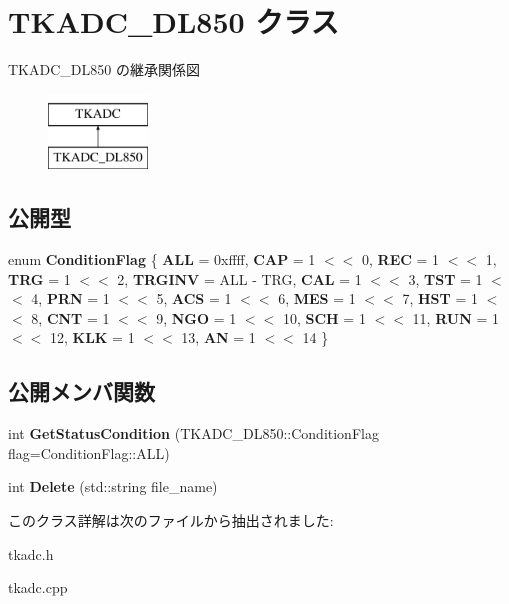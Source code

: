\hypertarget{class_t_k_a_d_c___d_l850}{}\section{T\+K\+A\+D\+C\+\_\+\+D\+L850 クラス}
\label{class_t_k_a_d_c___d_l850}
T\+K\+A\+D\+C\+\_\+\+D\+L850 の継承関係図\begin{figure}[H]
\begin{center}
\leavevmode
\includegraphics[height=2.000000cm]{class_t_k_a_d_c___d_l850}
\end{center}
\end{figure}
\subsection*{公開型}
\begin{DoxyCompactItemize}
\item 
\mbox{\label{class_t_k_a_d_c___d_l850_a25f41a7cd5213cd9814195b3d6ba11c0}} 
enum {\bfseries Condition\+Flag} \{ \newline
{\bfseries A\+LL} = 0xffff, 
{\bfseries C\+AP} = 1 $<$$<$ 0, 
{\bfseries R\+EC} = 1 $<$$<$ 1, 
{\bfseries T\+RG} = 1 $<$$<$ 2, 
\newline
{\bfseries T\+R\+G\+I\+NV} = A\+LL -\/ T\+RG, 
{\bfseries C\+AL} = 1 $<$$<$ 3, 
{\bfseries T\+ST} = 1 $<$$<$ 4, 
{\bfseries P\+RN} = 1 $<$$<$ 5, 
\newline
{\bfseries A\+CS} = 1 $<$$<$ 6, 
{\bfseries M\+ES} = 1 $<$$<$ 7, 
{\bfseries H\+ST} = 1 $<$$<$ 8, 
{\bfseries C\+NT} = 1 $<$$<$ 9, 
\newline
{\bfseries N\+GO} = 1 $<$$<$ 10, 
{\bfseries S\+CH} = 1 $<$$<$ 11, 
{\bfseries R\+UN} = 1 $<$$<$ 12, 
{\bfseries K\+LK} = 1 $<$$<$ 13, 
\newline
{\bfseries AN} = 1 $<$$<$ 14
 \}
\end{DoxyCompactItemize}
\subsection*{公開メンバ関数}
\begin{DoxyCompactItemize}
\item 
\mbox{\label{class_t_k_a_d_c___d_l850_a1eedebd8024beb6739c598e4970e6675}} 
int {\bfseries Get\+Status\+Condition} (T\+K\+A\+D\+C\+\_\+\+D\+L850\+::\+Condition\+Flag flag=Condition\+Flag\+::\+A\+LL)
\item 
\mbox{\label{class_t_k_a_d_c___d_l850_a209a0e5f4c6e61a7eb3ea21a15204a7c}} 
int {\bfseries Delete} (std\+::string file\+\_\+name)
\end{DoxyCompactItemize}


このクラス詳解は次のファイルから抽出されました\+:\begin{DoxyCompactItemize}
\item 
tkadc.\+h\item 
tkadc.\+cpp\end{DoxyCompactItemize}
